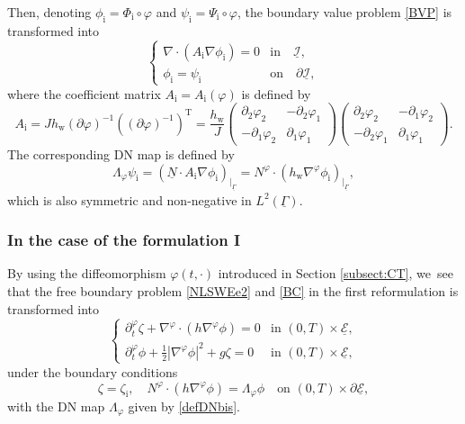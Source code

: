 \documentclass[10pt]{amsart}
\newcommand{\dt}{\partial_t}
\newcommand{\cI}{{\mathcal I}}
\newcommand{\cE}{{\mathcal E}}
\newcommand{\ul}[1]{\underline{#1}}
\newcommand{\itGamma}{\mathit{\Gamma}}
\theoremstyle{definition}
\begin{document}
Then, denoting $\phi_\mathrm{i}=\Phi_\mathrm{i}\circ \varphi$ and $\psi_\mathrm{i}=\Psi_\mathrm{i}\circ\varphi$, the boundary value problem \eqref{BVP} is transformed into
\begin{equation}\label{BVP2}
\begin{cases}
\nabla\cdot(A_\mathrm{i}\nabla\phi_\mathrm{i}) = 0 & \mbox{in} \quad \ul{\cI}, \\
\phi_\mathrm{i} = \psi_\mathrm{i} & \mbox{on} \quad \partial \ul{\cI},
\end{cases}
\end{equation}
where the coefficient matrix $A_\mathrm{i}=A_\mathrm{i}(\varphi)$ is defined by
\[
A_\mathrm{i} = J h_\mathrm{w} (\partial\varphi)^{-1}((\partial\varphi)^{-1})^\mathrm{T}
= \frac{h_\mathrm{w}}{J}
\begin{pmatrix}
\partial_2\varphi_2 & -\partial_2\varphi_1 \\
-\partial_1\varphi_2 & \partial_1\varphi_1
\end{pmatrix}
\begin{pmatrix}
\partial_2\varphi_2 & -\partial_1\varphi_2 \\
-\partial_2\varphi_1 & \partial_1\varphi_1
\end{pmatrix}.
\]
The corresponding DN map is defined by
\begin{equation}\label{defDNbis}
\Lambda_\varphi \psi_\mathrm{i} = (\ul{N}\cdot A_\mathrm{i}\nabla\phi_\mathrm{i})_{\vert_{\ul{\itGamma}}}
= N^\varphi \cdot (h_\mathrm{w} \nabla^\varphi \phi_\mathrm{i})_{\vert_{\ul{\itGamma}}},
\end{equation}
which is also symmetric and non-negative in $L^2(\ul{\itGamma})$.

\subsubsection{In the case of the formulation I}
By using the diffeomorphism $\varphi(t,\cdot)$ introduced in Section \ref{subsect:CT}, we~see that the free boundary problem \eqref{NLSWEe2} and \eqref{BC} in the first reformulation is transformed into
\begin{equation}\label{NLSWEe3}
\begin{cases}
\dt^\varphi \zeta + \nabla^\varphi \cdot (h\nabla^\varphi \phi) = 0 &\text{in } (0,T)\times\ul{\cE}, \\
\dt^\varphi \phi + \frac12|\nabla^\varphi \phi|^2 + g \zeta = 0 &\text{in } (0,T)\times\ul{\cE},
\end{cases}
\end{equation}
under the boundary conditions
\begin{equation}\label{BC2}
\zeta = \zeta_\mathrm{i}, \quad N^\varphi \cdot (h \nabla^\varphi \phi) = \Lambda_\varphi \phi \quad\text{on } (0,T)\times\partial \ul{\cE},
\end{equation}
with the DN map $\Lambda_\varphi$ given by \eqref{defDNbis}.
\end{document}
